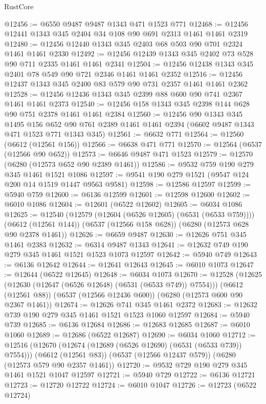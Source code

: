 \begin{lexlean}{RustCore}
\begin{coremodule}
@12456 := @6550 @9487 @9487 @1343 @471 @1523 @771
@12468 := @12456 @12441 @1343 @345 @2404 @34 @108 @90 @691 @2313 @1461 @1461 @2319
@12480 := @12456 @12440 @1343 @345 @2403 @68 @503 @90 @701 @2324 @1461 @1461 @2330
@12492 := @12456 @12439 @1343 @345 @2402 @73 @528 @90 @711 @2335 @1461 @1461 @2341
@12504 := @12456 @12438 @1343 @345 @2401 @78 @549 @90 @721 @2346 @1461 @1461 @2352
@12516 := @12456 @12437 @1343 @345 @2400 @83 @579 @90 @731 @2357 @1461 @1461 @2362
@12528 := @12456 @12436 @1343 @345 @2399 @88 @600 @90 @741 @2367 @1461 @1461 @2373
@12540 := @12456 @158 @1343 @345 @2398 @144 @628 @90 @751 @2378 @1461 @1461 @2384
@12560 := @12456
    @90
    @1343
    @345
    @1495
    @156
    @652
    @90
    @761
    @2389
    @1461
    @1461
    @2394
    (@6602 @9487 @1343 @471 @1523 @771 @1343 @345)
@12561 := @6632 @771
@12564 := @12560 (@6612 (@12561 @156))
@12566 := @6638 @471 @771
@12570 := @12564 (@6537 (@12566 @90 @652))
@12573 := @6646 @9487 @471 @1523
@12579 := @12570 (@6280 (@12573 @652 @90 @2389 @1461))
@12586 := @9532 @759 @190 @279 @345 @1461 @1521 @1086
@12597 := @9541 @190 @279 @1521 (@9547 @124 @200 @14 @1519 @1447 @9563 @9581)
@12598 := @12586 @12597
@12599 := @5940 @759
@12600 := @6136 @12599
@12601 := @12598 @12600
@12602 := @6010 @1086
@12604 := @12601 (@6522 @12602)
@12605 := @6034 @1086
@12625 := @12540
    (@12579 (@12604 (@6526 @12605) (@6531 (@6533 @759))))
    (@6612 (@12561 @144))
    (@6537 (@12566 @158 @628))
    (@6280 (@12573 @628 @90 @2378 @1461))
@12626 := @6659 @9487
@12630 := @12626 @751 @345 @1461 @2383
@12632 := @6314 @9487 @1343
@12641 := @12632 @749 @190 @279 @345 @1461 @1521 @1523 @1073 @12597
@12642 := @5940 @749
@12643 := @6136 @12642
@12644 := @12641 @12643
@12645 := @6010 @1073
@12647 := @12644 (@6522 @12645)
@12648 := @6034 @1073
@12670 := @12528
    (@12625 (@12630 (@12647 (@6526 @12648) (@6531 (@6533 @749)) @7554)))
    (@6612 (@12561 @88))
    (@6537 (@12566 @12436 @600))
    (@6280 (@12573 @600 @90 @2367 @1461))
@12674 := @12626 @741 @345 @1461 @2372
@12683 := @12632 @739 @190 @279 @345 @1461 @1521 @1523 @1060 @12597
@12684 := @5940 @739
@12685 := @6136 @12684
@12686 := @12683 @12685
@12687 := @6010 @1060
@12689 := @12686 (@6522 @12687)
@12690 := @6034 @1060
@12712 := @12516
    (@12670 (@12674 (@12689 (@6526 @12690) (@6531 (@6533 @739)) @7554)))
    (@6612 (@12561 @83))
    (@6537 (@12566 @12437 @579))
    (@6280 (@12573 @579 @90 @2357 @1461))
@12720 := @9532 @729 @190 @279 @345 @1461 @1521 @1047 @12597
@12721 := @5940 @729
@12722 := @6136 @12721
@12723 := @12720 @12722
@12724 := @6010 @1047
@12726 := @12723 (@6522 @12724)

\end{coremodule}
\end{lexlean}

